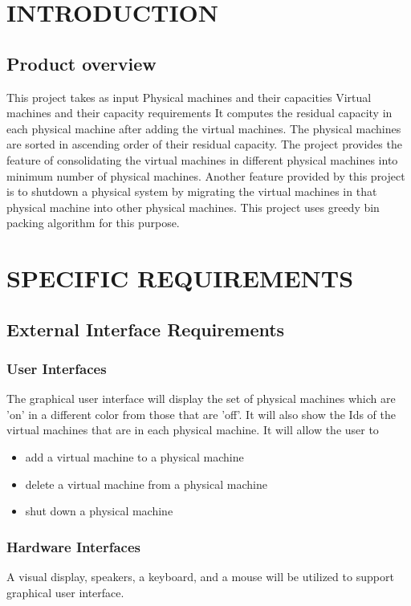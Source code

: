\documentclass{article}
\begin{document}
	\section{INTRODUCTION}
		\subsection{Product overview}
		This project takes as  input Physical machines and their capacities Virtual machines and their 
		capacity requirements It computes the residual capacity in each physical machine after adding the 
		virtual machines. The physical machines are sorted in ascending order of their residual capacity. 
		The project provides the feature of consolidating the virtual machines in different physical machines into 
		minimum number of physical machines. Another feature provided by this project is to shutdown a physical system
		by migrating the virtual machines in that physical machine into other physical machines. This project uses
		greedy bin packing algorithm for this purpose. \section{SPECIFIC REQUIREMENTS}
		\subsection{External Interface Requirements}
			\subsubsection{User Interfaces}
			The graphical user interface will display the set of physical machines which are 'on' in a different color from those 				that are 'off'. It will also show the Ids of the virtual machines that are in each physical machine. 
			It will allow the user to
			\begin{itemize}
				\item add a virtual machine to a physical machine
				\item delete a virtual machine from a physical machine
				\item shut down a physical machine
			\end{itemize}

			\subsubsection{Hardware Interfaces}
			A visual display, speakers, a keyboard, and a mouse will be utilized to support graphical user interface.
\end{document}
